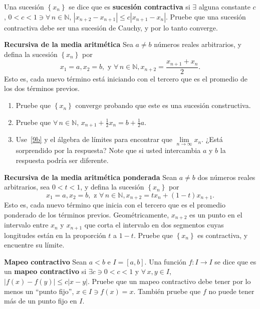 \documentclass{amsart}
\begin{document}
Una sucesión $\left\{x_{n}\right\}$ se dice que es \textbf{sucesión contractiva} si $\exists$ alguna constante $c$, $0<c<1\ni\forall\,n\in\mathbb{N}$, $|x_{n+2}-x_{n+1}|\leq c|x_{n+1}-x_{n}|$. Pruebe que una sucesión contractiva debe ser una sucesión de Cauchy, y por lo tanto converge.

\textbf{Recursiva de la media aritmética} Sea $a\neq b$ números reales arbitrarios, y defina la sucesión $\left\{x_{n}\right\}$ por
\[ x_{1}=a,x_{2}=b,\text{ y }\forall\,n\in\mathbb{N},x_{n+2}=\frac{x_{n+1}+x_{n}}{2}. \] Esto es, cada nuevo término está iniciando con el tercero que es el promedio de los dos términos previos.
\begin{enumerate}
	\item Pruebe que $\left\{x_{n}\right\}$ converge probando que este es una sucesión constructiva.
	\item Pruebe que $\forall\,n\in\mathbb{N}$, $x_{n+1}+\frac{1}{2}x_{n}=b+\frac{1}{2}a$.\label{9b}
	\item Use~\ref{9b} y el álgebra de límites para encontrar que  $\lim\limits_{n\to\infty}x_{n}$. ¿Está sorprendido por la respuesta? Note que si usted intercambia $a$ y $b$ la respuesta podría ser diferente.
\end{enumerate}
\textbf{Recursiva de la media aritmética ponderada} Sean $a\neq b$ dos números reales arbitrarios, sea $0<t<1$, y defina la sucesión $\left\{x_{n}\right\}$ por \[ x_{1}=a, x_{2}=b,\text{ z }\forall\,n\in\mathbb{N}, x_{n+2}=tx_{n}+\left(1-t\right)x_{n+1}. \] Esto es, cada nuevo término que inicia con el tercero que es el promedio ponderado de los términos previos. Geométricamente, $x_{n+2}$ es un punto en el intervalo entre $x_{n}$ y $x_{n+1}$ que corta el intervalo en dos segmentos cuyas longitudes están en la proporción $t$ a $1-t$. Pruebe que $\left\{x_{n}\right\}$ es contractiva, y encuentre su límite.

\textbf{Mapeo contractivo} Sean $a<b$ e $I=\left[a,b\right]$. Una función $f\colon I\rightarrow I$ se dice que es un \textbf{mapeo contractivo} si $\exists c\ni0<c<1$ y $\forall\,x,y\in I$, $|f\left(x\right)-f\left(y\right)|\leq c|x-y|$. Pruebe que un mapeo contractivo debe tener por lo menos un ``punto fijo'', $x\in I\ni f\left(x\right)=x$. También pruebe que $f$ no puede tener más de un punto fijo en $I$.
\end{document}
